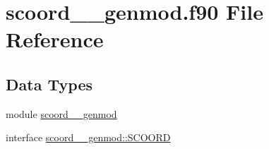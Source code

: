 \hypertarget{scoord____genmod_8f90}{\section{scoord\+\_\+\+\_\+genmod.\+f90 File Reference}
\label{scoord____genmod_8f90}
}
\subsection*{Data Types}
\begin{DoxyCompactItemize}
\item 
module \hyperlink{classscoord____genmod}{scoord\+\_\+\+\_\+genmod}
\item 
interface \hyperlink{interfacescoord____genmod_1_1SCOORD}{scoord\+\_\+\+\_\+genmod\+::\+S\+C\+O\+O\+R\+D}
\end{DoxyCompactItemize}
